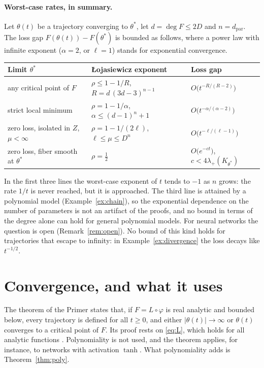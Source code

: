\documentclass[11pt]{article}
\theoremstyle{definition}
\theoremstyle{remark}
\newcommand{\dpar}{d_{\mathrm{par}}}
\begin{document}
\paragraph{Worst-case rates, in summary.} Let $\theta(t)$ be a trajectory converging to $\theta^*$, let $d=\deg F\le2D$ and $n=\dpar$. The loss gap $F(\theta(t))-F(\theta^*)$ is bounded as follows, where a power law with infinite exponent ($\alpha=2$, or $\ell=1$) stands for exponential convergence.
\begin{center}\small
\begin{tabular}{@{}lll@{}}
\toprule
Limit $\theta^*$ & {\L}ojasiewicz exponent & Loss gap\\
\midrule
any critical point of $F$ & $\rho\le1-1/R$,\quad $R=d\,(3d-3)^{n-1}$ & $O\big(t^{-R/(R-2)}\big)$\\
strict local minimum & $\rho=1-1/\alpha$,\quad $\alpha\le(d-1)^n+1$ & $O\big(t^{-\alpha/(\alpha-2)}\big)$\\
zero loss, isolated in $Z$, $\mu<\infty$ & $\rho=1-1/(2\ell)$,\quad $\ell\le\mu\le D^n$ & $O\big(t^{-\ell/(\ell-1)}\big)$\\
zero loss, fiber smooth at $\theta^*$ & $\rho=\frac12$ & $O\big(e^{-ct}\big)$,\quad $c<4\lambda_+(K_{\theta^*})$\\
\bottomrule
\end{tabular}
\end{center}
In the first three lines the worst-case exponent of $t$ tends to $-1$ as $n$ grows: the rate $1/t$ is never reached, but it is approached. The third line is attained by a polynomial model (Example~\ref{ex:chain}), so the exponential dependence on the number of parameters is not an artifact of the proofs, and no bound in terms of the degree alone can hold for general polynomial models. For neural networks the question is open (Remark~\ref{rem:open}). No bound of this kind holds for trajectories that escape to infinity: in Example~\ref{ex:divergence} the loss decays like $t^{-1/2}$.

\section{Convergence, and what it uses}\label{sec:convergence}

The theorem of the Primer states that, if $F=L\circ\varphi$ is real analytic and bounded below, every trajectory is defined for all $t\ge0$, and either $|\theta(t)|\to\infty$ or $\theta(t)$ converges to a critical point of $F$. Its proof rests on \eqref{eq:L}, which holds for all analytic functions \cite{Loj63,Loj84}. Polynomiality is not used, and the theorem applies, for instance, to networks with activation $\tanh$. What polynomiality adds is Theorem~\ref{thm:poly}.
\end{document}
